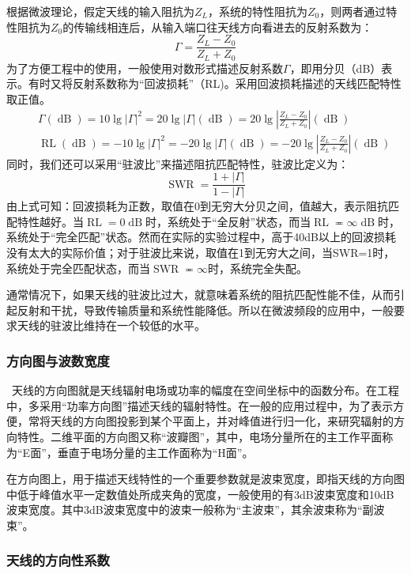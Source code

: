 \documentclass{article}
\newcommand{\tmop}[1]{\ensuremath{\operatorname{#1}}}
\begin{document}
根据微波理论，假定天线的输入阻抗为$Z_L$，系统的特性阻抗为$Z_0$，则两者通过特性阻抗为$Z_0$的传输线相连后，从输入端口往天线方向看进去的反射系数为：
\[ \Gamma = \frac{Z_L - Z_0}{Z_L + Z_0} \]
为了方便工程中的使用，一般使用对数形式描述反射系数$\Gamma$，即用分贝（dB）表示。有时又将反射系数称为“回波损耗”（RL)。采用回波损耗描述的天线匹配特性取正值。
\begin{eqnarray*}
  &  & \Gamma \left( \tmop{dB} \right) = 10 \lg \left| \Gamma \right|^2 = 20
  \lg \left| \Gamma \right| \left( \tmop{dB} \right) = 20 \lg \left| \frac{Z_L
  - Z_0}{Z_L + Z_0} \right| \left( \tmop{dB} \right)\\
  &  & \tmop{RL} \left( \tmop{dB} \right) = - 10 \lg \left| \Gamma \right|^2
  = - 20 \lg \left| \Gamma \right| \left( \tmop{dB} \right) = - 20 \lg \left|
  \frac{Z_L - Z_0}{Z_L + Z_0} \right| \left( \tmop{dB} \right)
\end{eqnarray*}
同时，我们还可以采用“驻波比”来描述阻抗匹配特性，驻波比定义为：
\[ \tmop{SWR} = \frac{1 + \left| \Gamma \right|}{1 - \left| \Gamma \right|} \]
由上式可知：回波损耗为正数，取值在0到无穷大分贝之间，值越大，表示阻抗匹配特性越好。当$\tmop{RL}
= 0 \tmop{dB}$时，系统处于“全反射”状态，而当$\tmop{RL}
\eqcirc \infty
\tmop{dB}$时，系统处于“完全匹配”状态。然而在实际的实验过程中，高于40dB以上的回波损耗没有太大的实际价值；对于驻波比来说，取值在1到无穷大之间，当SWR=1时，系统处于完全匹配状态，而当$\tmop{SWR}
\eqcirc \infty$时，系统完全失配。

通常情况下，如果天线的驻波比过大，就意味着系统的阻抗匹配性能不佳，从而引起反射和干扰，导致传输质量和系统性能降低。所以在微波频段的应用中，一般要求天线的驻波比维持在一个较低的水平。

\subsubsection{方向图与波数宽度}

\
天线的方向图就是天线辐射电场或功率的幅度在空间坐标中的函数分布。在工程中，多采用“功率方向图”描述天线的辐射特性。在一般的应用过程中，为了表示方便，常将天线的方向图投影到某个平面上，并对峰值进行归一化，来研究辐射的方向特性。二维平面的方向图又称“波瓣图”，其中，电场分量所在的主工作平面称为“E面”，垂直于电场分量的主工作面称为“H面”。

在方向图上，用于描述天线特性的一个重要参数就是波束宽度，即指天线的方向图中低于峰值水平一定数值处所成夹角的宽度，一般使用的有3dB波束宽度和10dB波束宽度。其中3dB波束宽度中的波束一般称为“主波束”，其余波束称为“副波束”。

\subsubsection{天线的方向性系数}
\end{document}
